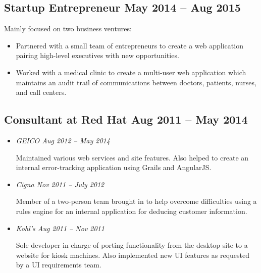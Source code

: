 \documentclass[12pt]{article}
\begin{document}
    

\subsection*{Startup Entrepreneur \hfill May 2014 -- Aug 2015}

Mainly focused on two business ventures:

\begin{itemize}
  \item Partnered with a small team of entrepreneurs to create a web application
    pairing high-level executives with new opportunities.

  \item Worked with a medical clinic to create a multi-user web application
    which maintains an audit trail of communications between doctors, patients,
    nurses, and call centers.
\end{itemize}

     \tag{\LaTeX}

\subsection*{Consultant at Red Hat \hfill Aug 2011 -- May 2014}

  \begin{itemize}

    \item \textit{GEICO \hfill Aug 2012 -- May 2014}

      Maintained various web services and site features. Also helped to create
      an internal error-tracking application using Grails and AngularJS.

          
       

    \item \textit{Cigna \hfill Nov 2011 -- July 2012}

      Member of a two-person team brought in to help overcome difficulties using
      a rules engine for an internal application for deducing customer
      information.

       

    \item \textit{Kohl's \hfill Aug 2011 -- Nov 2011}

      Sole developer in charge of porting functionality from the desktop site to
      a website for kiosk machines. Also implemented new UI features as
      requested by a UI requirements team.

       

  \end{itemize}
\end{document}
